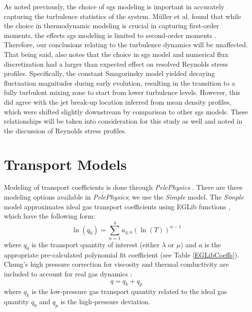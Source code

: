 As noted previously, the choice of \gls{sgs} modeling is important in accurately capturing the turbulence statistics of the system. M\"{u}ller et al. found that while the choice in thermodynamic modeling is crucial in capturing first-order moments, the effects \gls{sgs} modeling is limited to second-order moments \cite{doi:10.1063/1.4937948}. Therefore, our conclusions relating to the turbulence dynamics will be unaffected. That being said, \cite{doi:10.1063/1.4937948} also notes that the choice in \gls{sgs} model and numerical flux discretization had a larger than expected effect on resolved Reynolds stress profiles. Specifically, the constant Smagorinsky model yielded decaying fluctuation magnitudes during early evolution, resulting in the transition to a fully turbulent mixing zone to start from lower turbulence levels. However, this did agree with the jet break-up location inferred from mean density profiles, which were shifted slightly downstream by comparison to other \gls{sgs} models. These relationships will be taken into consideration for this study as well and noted in the discussion of Reynolds stress profiles.


\section{Transport Models}
Modeling of transport coefficients is done through \textit{PelePhysics} \cite{PelePhysics}. There are three modeling options available in \textit{PelePhysics}; we use the \textit{Simple} model. The \textit{Simple} model approximates ideal gas transport coefficients using EGLib functions \cite{ERN1995105}, which have the following form:
\begin{equation} \label{EGLib}
\ln{(q_0)} = \sum\limits_{n=1}^{4} a_{q,n}\left( \ln{(T)}\right)^{n-1}
\end{equation}
where $q_0$ is the transport quantity of interest (either $\lambda$ or $\mu$) and $a$ is the appropriate pre-calculated polynomial fit coefficient (see Table \ref{EGLibCoeffs}). Chung's high pressure correction for viscosity and thermal conductivity are included to account for real gas dynamics \cite{chung:1988}: 
\begin{equation} \label{chung_general}
q = q_k + q_p
\end{equation}
where $q_k$ is the low-pressure gas transport quantity related to the ideal gas quantity $q_0$ and $q_p$ is the high-pressure deviation. 

